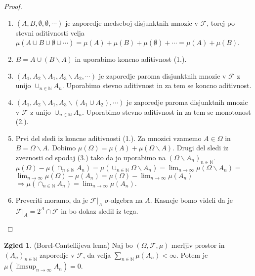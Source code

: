 \documentclass[a4paper,12pt]{article}
\theoremstyle{definition} %
\newtheorem{zgled}[definicija]{Zgled}
\theoremstyle{plain} %
\newcommand{\N}{\mathbb{N}}
\newcommand{\F}{\mathcal{F}}
\begin{document}
            \begin{proof}
                \begin{enumerate}
                    \item $\left(A, B, \emptyset, \emptyset, \cdots \right)$ je zaporedje medseboj disjunktnih mnozic v $\F$, torej po stevni aditivnosti velja $\mu(A \cup B \cup \emptyset \cup \cdots) = \mu(A) + \mu(B) + \mu(\emptyset) + \cdots = \mu(A) + \mu(B)$.
                    \item $B = A \cup (B \backslash A)$ in uporabimo koncno aditivnost (1.).
                    \item $\left(A_1, A_2\backslash A_1, A_3\backslash A_2, \cdots \right)$ je zaporedje paroma disjunktnih mnozic v $\F$ z unijo $\cup_{n \in \N}A_n$. Uporabimo stevno aditivnost in za tem se koncno aditivnost.
                    \item $\left(A_1, A_2\backslash A_1, A_3\backslash (A_1 \cup A_2), \cdots \right)$ je zaporedje paroma disjunktnih mnozic v $\F$ z unijo $\cup_{n \in \N}A_n$. Uporabimo stevno aditivnost in za tem se monotonost (2.).
                    \item Prvi del sledi iz koncne aditivnosti (1.). Za mnozici vzamemo $A \in \Omega$ in  $B = \Omega \backslash A$. Dobimo $\mu(\Omega) = \mu(A) + \mu(\Omega \backslash A)$. Drugi del sledi iz zveznosti od spodaj (3.) tako da jo uporabimo na $\left(\Omega\backslash A_n \right)_{n \in \N}$. $\mu(\Omega) - \mu(\cap_{n \in \N}A_n) = \mu\left( \cup_{n \in \N}\Omega\backslash A_n\right) = \lim_{n \rightarrow \infty}\mu(\Omega\backslash A_n) = $ $\lim_{n \rightarrow \infty}\mu(\Omega) - \mu(A_n) = \mu(\Omega) - \lim_{n \rightarrow \infty}\mu(A_n)$ $ \Rightarrow \mu(\cap_{n \in \N}A_n) = \lim_{n \rightarrow \infty}\mu(A_n).$
                    \item Preveriti moramo, da je $\F|_A$ $\sigma$-algebra na $A$. Kasneje bomo videli da je $\F|_A = 2^A \cap \F$ in bo dokaz sledil iz tega.
                \end{enumerate}
            \end{proof}

            \begin{zgled}(Borel-Cantellijeva lema)
                Naj bo $\left( \Omega, \F, \mu \right)$ merljiv prostor in $(A_n)_{n \in \N}$ zaporedje v $\F$, da velja $\sum_{n \in \N}\mu(A_n) < \infty$. Potem je $\mu(\limsup_{n \rightarrow \infty}A_n) = 0$.
            \end{zgled}
\end{document}
